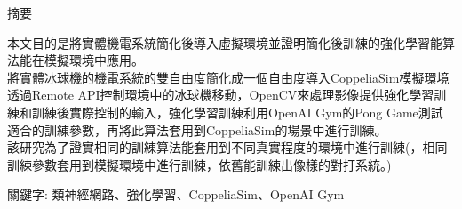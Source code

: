 \begin{center}
摘要
\end{center}
\qquad 本文目的是將實體機電系統簡化後導入虛擬環境並證明簡化後訓練的強化學習能算法能在模擬環境中應用。\\

將實體冰球機的機電系統的雙自由度簡化成一個自由度導入CoppeliaSim模擬環境透過Remote API控制環境中的冰球機移動，OpenCV來處理影像提供強化學習訓練和訓練後實際控制的輸入，強化學習訓練利用OpenAI Gym的Pong Game測試適合的訓練參數，再將此算法套用到CoppeliaSim的場景中進行訓練。\\

該研究為了證實相同的訓練算法能套用到不同真實程度的環境中進行訓練(，相同訓練參數套用到模擬環境中進行訓練，依舊能訓練出像樣的對打系統。)\\

\begin{center}
\fontsize{10pt}{20pt}\selectfont 關鍵字: 類神經網路、強化學習、\sectionef CoppeliaSim、OpenAI Gym
\end{center}